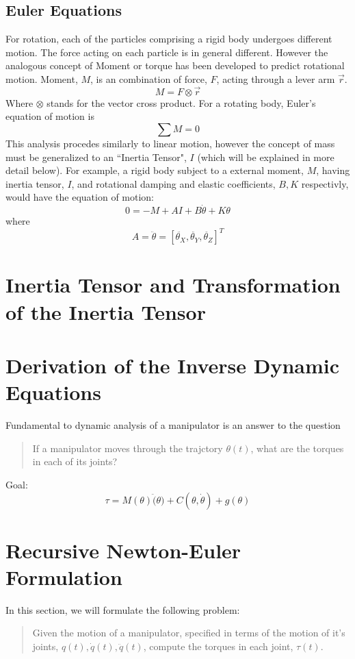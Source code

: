 \subsection{Euler Equations}

For rotation, each of the particles comprising a rigid body undergoes different motion.  The force acting on each particle is in general different.  However
the analogous concept of Moment or torque has been developed to predict rotational motion.   Moment, $M$, is an combination of force, $F$,  acting through a lever arm $\vec{r}$.
\[
M = F \otimes \vec{r}
\]
Where $\otimes$ stands for the vector cross product.
For a rotating body, Euler's equation of motion is
\[
\sum M = 0
\]
This analysis procedes similarly to linear motion, however the concept of mass must be generalized to an ``Inertia Tensor", $I$ (which will be explained in more detail below).
For example, a rigid body subject to a external moment, $M$, having  inertia tensor, $I$, and rotational damping and elastic coefficients, $B, K$ respectivly, would have the equation of motion:
\[
0 = -M + AI + B\dot{\theta} + K\theta
\]
where
\[
A = \ddot{\theta} = [\ddot{\theta_X}, \ddot{\theta_Y}, \ddot{\theta_Z}]^T
\]


\section{Inertia Tensor and Transformation of the Inertia Tensor}



\section{Derivation of the Inverse Dynamic Equations}
Fundamental to dynamic analysis of a manipulator is an answer to the question
\begin{quotation}
If a manipulator moves through the trajctory $\theta(t)$, what are the torques in each of its joints?
\end{quotation}


Goal:
$$
\tau = M(\theta)\ddot(\theta) + C(\theta, \dot{\theta}) + g(\theta)
$$


\section{Recursive Newton-Euler Formulation}
In this section, we will formulate the following problem:
\begin{quotation}
  Given the motion of a manipulator, specified in terms of the motion of it's joints, $q(t), \dot{q}(t), \ddot{q}(t)$, compute the torques in each joint, $\tau(t)$.
\end{quotation}




